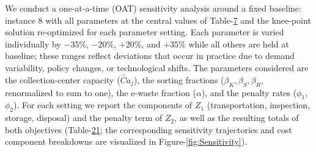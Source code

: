 \documentclass[11pt, a4paper]{article}
\begin{document}
We conduct a one-at-a-time (OAT) sensitivity analysis around a fixed
baseline: instance 8 with all parameters at the central values of
Table-\protect\hyperlink{tab:Values}{7} and the knee-point solution re-optimized for each parameter setting. Each parameter is varied individually by $-35\%$, $-20\%$, $+20\%$, and $+35\%$ while all others are held at baseline; these ranges reflect deviations that occur in practice due to demand variability, policy changes, or technological shifts. The parameters considered are the collection-center capacity ($\widetilde{Ca}_j$), the sorting fractions ($\beta_K, \beta_S, \beta_R$, renormalized to sum to one), the e-waste fraction ($\alpha$), and the penalty rates ($\phi_1$, $\phi_2$). For each setting we report the components of $Z_1$ (transportation, inspection, storage, disposal) and the penalty term of $Z_2$, as well as the resulting totals of both objectives (Table-\protect\hyperlink{tab:Sensitivity}{21}; the corresponding sensitivity trajectories and cost component breakdowns are visualized in Figure-\ref{fig:Sensitivity}).
\end{document}
